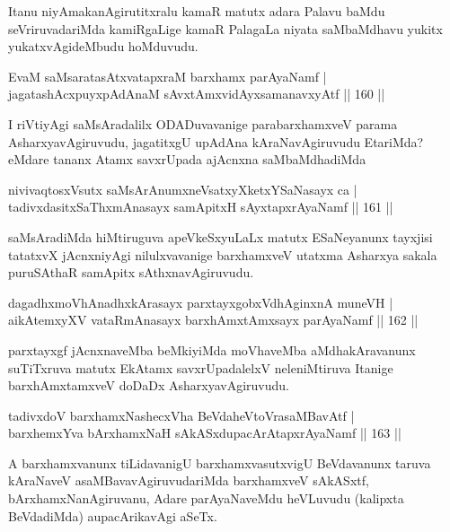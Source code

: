 \begin{artha}
Itanu niyAmakanAgirutitxralu kamaR matutx adara Palavu baMdu seVriruvadariMda kamiRgaLige kamaR PalagaLa niyata saMbaMdhavu yukitx yukatxvAgideMbudu hoMduvudu.
\end{artha}

\begin{shl}
EvaM saMsaratasAtxvatapxraM barxhamx parAyaNamf |\\
jagatashAcxpuyxpAdAnaM sAvxtAmxvidAyxsamanavxyAtf \hfill || 160 ||
\end{shl}

\begin{artha}%
I riVtiyAgi saMsAradalilx ODADuvavanige parabarxhamxveV parama AsharxyavAgiruvudu, jagatitxgU upAdAna kAraNavAgiruvudu EtariMda? eMdare tananx Atamx savxrUpada ajAcnxna saMbaMdhadiMda
\end{artha}

\begin{shl}
nivivaqtosxVsutx saMsArAnumxneVsatxyXketxYSaNasayx ca |\\
tadivxdasitxSaThxmAnasayx samApitxH sAyxtapxrAyaNamf \hfill || 161 ||
\end{shl}

\begin{artha}
saMsAradiMda hiMtiruguva apeVkeSxyuLaLx matutx ESaNeyanunx tayxjisi tatatxvX jAcnxniyAgi nilulxvavanige barxhamxveV utatxma Asharxya sakala puruSAthaR samApitx sAthxnavAgiruvudu.
\end{artha}

\begin{shl}
dagadhxmoVhAnadhxkArasayx parxtayxgobxVdhAginxnA muneVH |\\
aikAtemxyXV vataRmAnasayx barxhAmxtAmx\s sayx parAyaNamf \hfill || 162 ||
\end{shl}

\begin{artha}
parxtayxgf jAcnxnaveMba beMkiyiMda moVhaveMba aMdhakAravanunx suTiTxruva matutx EkAtamx savxrUpadalelxV neleniMtiruva Itanige barxhAmxtamxveV doDaDx AsharxyavAgiruvudu.
\end{artha}

\begin{shl}
tadivxdoV barxhamxNashecxVha BeVdaheVtoVrasaMBavAtf |\\
barxhemxYva bArxhamxNaH sAkASxdupacArAtapxrAyaNamf \hfill || 163 ||
\end{shl}

\begin{artha}
A barxhamxvanunx tiLidavanigU barxhamxvasutxvigU BeVdavanunx taruva kAraNaveV asaMBavavAgiruvudariMda barxhamxveV sAkASxtf, bArxhamxNanAgiruvanu, Adare parAyaNaveMdu heVLuvudu (kalipxta BeVdadiMda) aupacArikavAgi aSeTx.
\end{artha}

